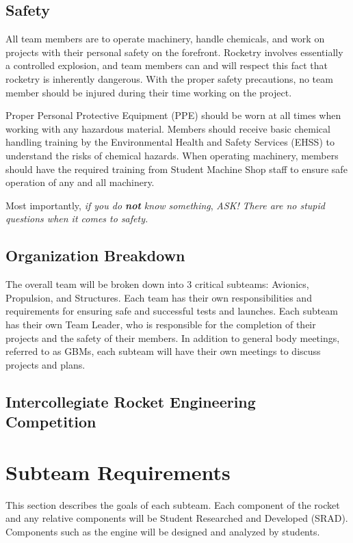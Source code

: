 \documentclass[12pt,article]{memoir}
\begin{document}
\section{Safety}
All team members are to operate machinery, handle chemicals, and work on projects with their personal safety on the forefront. Rocketry involves essentially a controlled explosion, and team members can and will respect this fact that rocketry is inherently dangerous. With the proper safety precautions, no team member should be injured during their time working on the project.\par
Proper Personal Protective Equipment (PPE) should be worn at all times when working with any hazardous material. Members should receive basic chemical handling training by the Environmental Health and Safety Services (EHSS) to understand the risks of chemical hazards. When operating machinery, members should have the required training from Student Machine Shop staff to ensure safe operation of any and all machinery.\par
Most importantly, \textit{if you do \textbf{not} know something}, \textit{ASK!} \textit{There are no stupid questions when it comes to safety.}

\section{Organization Breakdown}
The overall team will be broken down into 3 critical subteams: Avionics, Propulsion, and Structures. Each team has their own responsibilities and requirements for ensuring safe and successful tests and launches. Each subteam has their own Team Leader, who is responsible for the completion of their projects and the safety of their members. In addition to general body meetings, referred to as GBMs, each subteam will have their own meetings to discuss projects and plans.

\section{Intercollegiate Rocket Engineering Competition}

\newpage

\chapter{Subteam Requirements}
This section describes the goals of each subteam. Each component of the rocket and any relative components will be Student Researched and Developed (SRAD). Components such as the engine will be designed and analyzed by students. 
\end{document}
